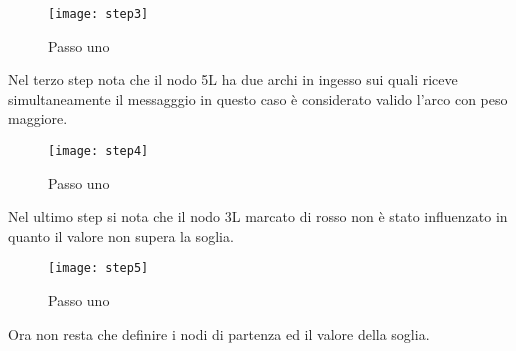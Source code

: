 \begin{figure}[!htbp]
  \begin{center}
    \texttt{[image: step3]}
  	\caption{Passo uno}
  	\label{step3}
  \end{center}
\end{figure}
\clearpage
Nel terzo step nota che il nodo 5L ha due archi in ingesso sui quali riceve simultaneamente
il messagggio in questo caso è considerato valido l'arco con peso maggiore.
\begin{figure}[!htbp]
  \begin{center}
    \texttt{[image: step4]}
  	\caption{Passo uno}
  	\label{step4}
  \end{center}
\end{figure}
\clearpage
Nel ultimo step si nota che il nodo 3L marcato di rosso non è stato influenzato
in quanto il valore non supera la soglia.
\begin{figure}[!htbp]
  \begin{center}
    \texttt{[image: step5]}
  	\caption{Passo uno}
  	\label{step5}
  \end{center}
\end{figure}
Ora non resta che definire i nodi di partenza ed il valore della soglia.
\clearpage
